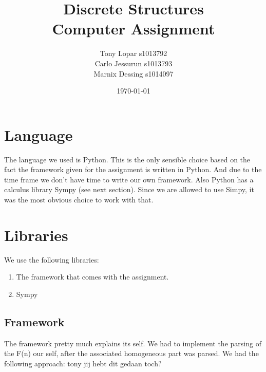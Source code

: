 \documentclass{article}
\begin{document}
\title{Discrete Structures \\ Computer Assignment}
\date{\today}
\author{Tony Lopar s1013792 \\ Carlo Jessurun s1013793 \\ Marnix Dessing s1014097}
\maketitle

\section{Language}
The language we used is Python. This is the only sensible choice based on the fact the framework given for the assignment is written in Python. And due to the time frame we don't have time to write our own framework. Also Python has a calculus library Sympy (see next section). Since we are allowed to use Simpy, it was the most obvious choice to work with that.

\section{Libraries}
We use the following libraries:
\begin{enumerate}
    \item The framework that comes with the assignment.
    \item Sympy
\end{enumerate}

\subsection{Framework}
The framework pretty much explains its self.
We had to implement the parsing of the F(n) our self, after the associated homogeneous part was parsed. We had the following approach: tony jij hebt dit gedaan toch?


\newpage
\end{document}
